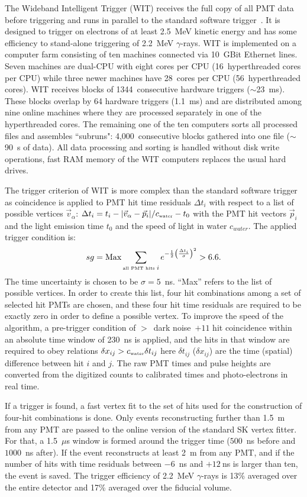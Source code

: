 The Wideband Intelligent Trigger (WIT) receives the full copy of all PMT data before triggering and runs in parallel to the standard software trigger~\cite{wit,Elnimr:2017nzi}. It is designed to trigger on electrons of at least 2.5~MeV kinetic energy and has some efficiency to stand-alone triggering of 2.2~MeV $\gamma$-rays. WIT is implemented on a computer farm consisting of ten machines connected via 10~GBit Ethernet lines. Seven machines are dual-CPU with eight cores per CPU (16~hyperthreaded cores per CPU) while three newer machines have 28~cores per CPU (56~hyperthreaded cores). WIT receives blocks of 1344~consecutive hardware triggers ($\sim$23~ms). These blocks overlap by 64 hardware triggers (1.1~ms) and are distributed among nine online machines where they are processed separately in one of the hyperthreaded cores. The remaining one of the ten computers sorts all processed files and assembles ``subruns": 4,000~consecutive blocks gathered into one file ($\sim$90~s of data). All data processing and sorting is handled without disk write operations, fast RAM memory of the WIT computers replaces the usual hard drives.

The trigger criterion of WIT is more complex than the standard software trigger as coincidence is applied to PMT hit time residuals
$\Delta t_i$ with respect to a list of possible vertices $\vec{v}_\alpha$:
$\Delta t_i=t_i-|\vec{v}_\alpha-\vec{p}_i|/c_{\mbox{\tiny water}}-t_0$ with the PMT hit vectors $\vec{p}_i$ and the light emission time $t_0$ and the speed of light in water $c_{water}$.
The applied trigger condition is:
\[
sg=\mbox{Max} \sum_{\mbox{\tiny all PMT hits } i} e^{-\frac{1}{2}\left( \frac{\Delta t_i}{\sigma}\right)^2}>6.6.
\]
The time uncertainty is chosen to be $\sigma=5$~ns. ``Max'' refers to the list of possible vertices. In order to create this list, four hit combinations among a set of selected hit PMTs are chosen, and these four hit time residuals are required to be exactly zero in order to define a possible vertex. To improve the speed of the algorithm, a pre-trigger condition of $>$~dark noise~$+11$ hit coincidence within an absolute time window of 230~ns is applied, and the hits in that window are required to obey relations $\delta x_{ij}>c_{\mbox{\tiny water}} \delta t_{ij}$ here $\delta t_{ij}$ ($\delta x_{ij}$) are the time (spatial) difference between hit $i$ and $j$. The raw PMT times and pulse heights are converted from the digitized counts to calibrated times and photo-electrons in real time.

If a trigger is found, a fast vertex fit to the set of hits used for the construction of four-hit combinations is done. Only events reconstructing further than 1.5~m from any PMT are passed to the online version of the standard SK vertex fitter. For that, a 1.5~$\mu$s window is formed around the trigger time ($500$~ns before and $1000$~ns after). If the event reconstructs at least 2~m from any PMT, and if the number of hits with time residuals between $-6$~ns and $+12~$ns is larger than ten, the event is saved. The trigger efficiency of 2.2~MeV $\gamma$-rays is 13\% averaged over the entire detector and 17\% averaged over the fiducial volume.

